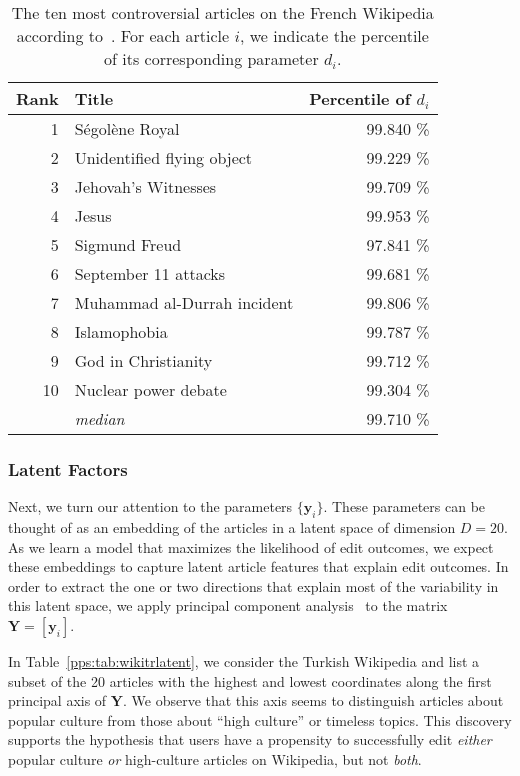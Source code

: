\begin{table}
	\centering
	\caption{The ten most controversial articles on the French Wikipedia according to~\citet{yasseri2014most}.
		For each article $i$, we indicate the percentile of its corresponding parameter $d_i$.}
	\label{pps:tab:wikicontrov}
	\begin{tabular}{rlr}
		\toprule
		Rank & Title                       & Percentile of $d_i$ \\
		\midrule
		1    & Ségolène Royal              & \num{99.840} \%     \\
		2    & Unidentified flying object  & \num{99.229} \%     \\
		3    & Jehovah's Witnesses         & \num{99.709} \%     \\
		4    & Jesus                       & \num{99.953} \%     \\
		5    & Sigmund Freud               & \num{97.841} \%     \\
		6    & September 11 attacks        & \num{99.681} \%     \\
		7    & Muhammad al-Durrah incident & \num{99.806} \%     \\
		8    & Islamophobia                & \num{99.787} \%     \\
		9    & God in Christianity         & \num{99.712} \%     \\
		10   & Nuclear power debate        & \num{99.304} \%     \\
		\addlinespace
		     & \emph{median}               & \num{99.710} \%     \\
		\bottomrule
	\end{tabular}
\end{table}

\subsubsection{Latent Factors}

Next, we turn our attention to the parameters $\{ \bm{y}_i \}$.
These parameters can be thought of as an embedding of the articles in a latent space of dimension $D = 20$.
As we learn a model that maximizes the likelihood of edit outcomes, we expect these embeddings to capture latent article features that explain edit outcomes.
In order to extract the one or two directions that explain most of the variability in this latent space, we apply principal component analysis~\citep{bishop2006pattern} to the matrix $\bm{Y} = [\bm{y}_i]$.

In Table~\ref{pps:tab:wikitrlatent}, we consider the Turkish Wikipedia and list a subset of the \num{20} articles with the highest and lowest coordinates along the first principal axis of $\bm{Y}$.
We observe that this axis seems to distinguish articles about popular culture from those about ``high culture'' or timeless topics.
This discovery supports the hypothesis that users have a propensity to successfully edit \emph{either} popular culture \emph{or} high-culture articles on Wikipedia, but not \emph{both}.

